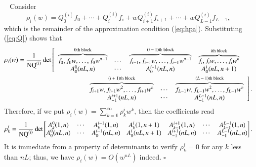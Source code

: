 \documentclass[12pt]{article}
\numberwithin{equation}{section}
\def\pf{\noindent{\it Proof.} \ }
\def\qed{\hfill $\square$}
\begin{document}
\pf
Consider
\[
\rho_i(w)= Q_0^{(i)} f_0+\cdots +Q_i^{(i)} f_i +w Q_{i+1}^{(i)} f_{i+1}  + \cdots + w Q_{L-1}^{(i)}f_{L-1},
\]
which is  the remainder of the approximation condition (\ref{eq:hpa}).
Substituting (\ref{eq:Q}) shows that
\begin{align*}
\rho_i(w)
&= \frac{1}{{\rm NQ}^{(i)}}
\det
\left[
\begin{array}{cccc}
\overbrace{f_0, f_0 w,\ldots,f_0 w^{n-1}}^{\text{$0$th block}} 
& \cdots 
& \overbrace{f_{i-1}, f_{i-1} w,\ldots,f_{i-1} w^{n-1}}^{\text{$(i-1)$th block}}
& \overbrace{f_i, f_i w,\ldots,f_i w^n}^{\text{$i$th block}}
\\
A^0_0(nL,n) 
& \cdots 
&  A^{i-1}_0(nL,n) 
&  A^{i}_0(nL,n+1) 
\end{array}
\right.
\\
& \qquad \qquad \qquad \qquad \qquad
\left.
\begin{array}{ccc}
\overbrace{f_{i+1}w, f_{i+1} w^2,\ldots,f_{i+1} w^n}^{\text{$(i+1)$th block}}
& \cdots 
&\overbrace{f_{L-1}w, f_{L-1} w^2,\ldots,f_{L-1} w^n}^{\text{$(L-1)$th block}}
\\
A^{i+1}_{-1}(nL,n) 
& \cdots   
& A^{L-1}_{-1}(nL,n)
\end{array}
\right].
\end{align*}
Therefore, if we put $\rho_i(w)=\sum_{k=0}^\infty \rho_{k}^i w^k$, 
then the coefficients read 
\[
\rho_{k}^i
=
\frac{1}{{\rm NQ}^{(i)}}
\det
\begin{bmatrix}
A^0_k(1,n) 
&  \cdots 
&  A^{i-1}_k(1,n)
&  A^{i}_k(1,n+1)
& A^{i+1}_{k-1}(1,n)
& \cdots
& A^{L-1}_{k-1}(1,n)
\\
A^0_0(nL,n) 
& \cdots 
&  A^{i-1}_0(nL,n) 
&  A^{i}_0(nL,n+1) 
&A^{i+1}_{-1}(nL,n) 
& \cdots   
& A^{L-1}_{-1}(nL,n)
\end{bmatrix}.
\]
It is immediate
from a property of determinants
to verify 
$\rho_{k}^i=0$
for any $k$ less than $nL$;
thus, we have $\rho_i(w)=O(w^{nL})$ indeed.
\qed
\\
\end{document}
